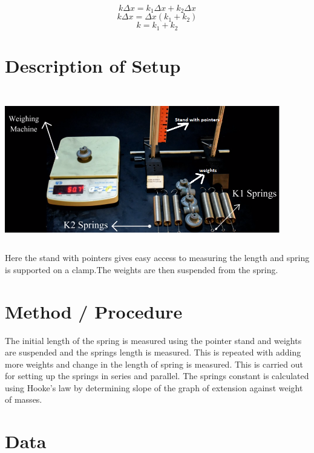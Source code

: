 $$ k \Delta x = k_1 \Delta x + k_2 \Delta x $$
$$ k \Delta x = \Delta x( k_1 + k_2) $$
$$ k = k_1 + k_2 $$





\section{Description of Setup}
\includegraphics[width=12cm, height=7cm]{figures/fig1.png} \\
Here the stand with pointers gives easy access to measuring the length and spring is supported on a clamp.The weights are then suspended from the spring.

\section{Method / Procedure}
The initial length of the spring is measured using the pointer stand and weights are suspended and the springs length is measured. This is repeated with adding more weights and change in the length of spring is measured. 
This is carried out for setting up the springs in series and parallel. 
The springs constant is calculated using Hooke's law by determining slope of the graph of extension against weight of masses.

\section{Data}

